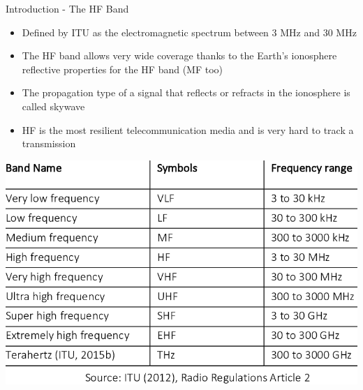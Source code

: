 \documentclass[aspectratio=169,xcolor={x11names,svgnames,dvipsnames}]{beamer}
\begin{document}
\begin{frame}{Introduction - The HF Band}

  \begin{itemize}
  \item Defined by ITU as the electromagnetic spectrum between 3 MHz and 30 MHz
  \item The HF band allows very wide coverage thanks to the Earth's ionosphere reflective
    properties for the HF band (MF too)
  \item The propagation type of a signal that reflects or refracts in the ionosphere is called
    skywave
  \item HF is the most resilient telecommunication media and is very hard
  to track a transmission
  \end{itemize}

  \begin{center}
    \vspace{-0.1cm}
  \includegraphics[width=.5\columnwidth]{bands.png}
\end{center}

\end{frame}
\end{document}
